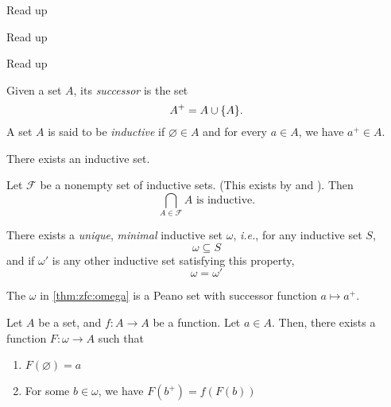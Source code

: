 \documentclass[12pt]{article}
\begin{document}
\begin{axiom} \label{zfc:regularity}
    Read up
\end{axiom}

\begin{axiom} \label{zfc:replacement}
    Read up
\end{axiom}

\begin{axiom} \label{zfc:choice}
    Read up
\end{axiom}

\begin{defn} \label{defn:zfc:inductive}
    Given a set $A$, its \emph{successor} is the set \[
        A^{+} = A \cup \set{A}.
    \] A set $A$ is said to be \emph{inductive} if $\varnothing \in A$ and for every $a \in A$, we have $a^{+} \in A$.
\end{defn}

\begin{axiom} \label{zfc:infinity}
    There exists an inductive set.    
\end{axiom}

\begin{lem} \label{thm:zfc:inductive_intersection}
    Let $\mathscr{F}$ be a nonempty set of inductive sets. (This exists by  and ). Then \[
        \bigcap_{A \in \mathscr{F}}{A} \text{ is inductive.}
    \]
\end{lem}

\begin{thm} \label{thm:zfc:omega}
    There exists a \emph{unique}, \emph{minimal} inductive set $\omega$, \textit{i.e.}, for any inductive set $S$, \[
        \omega \subseteq S
    \] and if $\omega'$ is any other inductive set satisfying this property, \[
        \omega = \omega'
    \]
\end{thm}

\begin{thm} \label{thm:zfc:omega_is_peano}
    The $\omega$ in \cref{thm:zfc:omega} is a Peano set with successor function $a \mapsto a^{+}$.
\end{thm}

\begin{thm} \label{thm:zfc:recursion}
    Let $A$ be a set, and $f: A \to A$ be a function. Let $a \in A$. Then, there exists a function $F: \omega \to A$ such that
    \begin{enumerate}[label=(\alph*)]
        \item $F(\varnothing) = a$
        \item For some $b \in \omega$, we have $F(b^{+}) = f(F(b))$
    \end{enumerate}
\end{thm}
\end{document}
